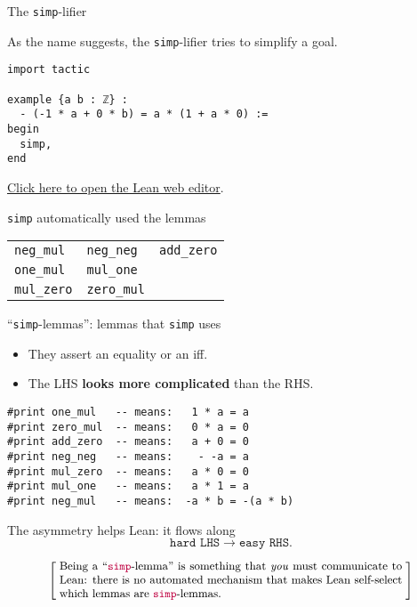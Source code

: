 \documentclass{beamer}
\begin{document}
\begin{frame}[fragile]{The {\color{purple}\texttt{simp}}-lifier}

As the name suggests, the {\color{purple}\verb`simp`}-lifier tries to simplify a goal.

\begin{verbatim}
import tactic

example {a b : ℤ} :
  - (-1 * a + 0 * b) = a * (1 + a * 0) :=
begin
  simp,
end
\end{verbatim}

\href{https://leanprover-community.github.io/lean-web-editor/#code=import%20tactic%0A%0Aexample%20%7Ba%20b%20%3A%20%E2%84%A4%7D%20%3A%0A%20%20-%20%28-1%20*%20a%20%2B%200%20*%20b%29%20%3D%20a%20*%20%281%20%2B%20a%20*%200%29%20%3A%3D%0Abegin%0A%20%20simp%2C%0Aend}{Click here to open the Lean web editor}.
\bigskip

{\color{purple}\verb`simp`} automatically used the lemmas
\bigskip

\begin{tabular}{|l|l|l|}
\hline
{\color{purple}\verb`neg_mul`} & {\color{purple}\verb`neg_neg`} & {\color{purple}\verb`add_zero`} \\
{\color{purple}\verb`one_mul`} & {\color{purple}\verb`mul_one`} &\\
{\color{purple}\verb`mul_zero`} & {\color{purple}\verb`zero_mul`} &\\
\hline
\end{tabular}

\end{frame}

\begin{frame}[fragile]{``{\color{purple}\texttt{simp}}-lemmas'': lemmas that {\color{purple}\texttt{simp}} uses}

\begin{itemize}
\item
  They assert an equality or an iff.
\item
  The LHS {\textbf{looks more complicated}} than the RHS.
\end{itemize}

\begin{verbatim}
#print one_mul   -- means:   1 * a = a
#print zero_mul  -- means:   0 * a = 0
#print add_zero  -- means:   a + 0 = 0
#print neg_neg   -- means:    - -a = a
#print mul_zero  -- means:   a * 0 = 0
#print mul_one   -- means:   a * 1 = a
#print neg_mul   -- means:  -a * b = -(a * b)
\end{verbatim}

The asymmetry helps Lean: it flows along
$${\texttt{hard LHS}} \longrightarrow {\texttt{easy RHS}}.$$

\smallskip
\[
  \left[ \;
  \makebox{\parbox{0.8\textwidth}{\small
  Being a ``{\color{purple}\texttt{simp}}-lemma'' is something that {\emph{you}} must communicate to Lean: there is no automated mechanism that makes Lean self-select which lemmas are {\color{purple}\texttt{simp}}-lemmas.
  }}
  \; \right]
\]
\bigskip
\end{frame}
\end{document}
